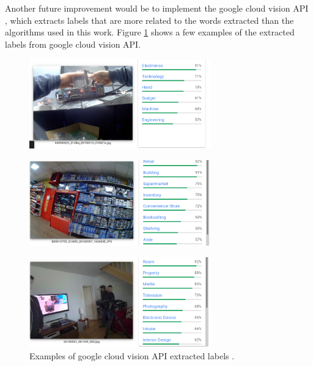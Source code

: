 Another future improvement would be to implement the google cloud vision API \cite{google}, which extracts labels that are more related to the words extracted than the algorithms used in this work. Figure \ref{fig:visiiion} shows a few examples of the extracted labels from google cloud vision API.
\newpage

\begin{figure}[H]
    \centering
    \captionsetup{justification=centering}
    \includegraphics[width=0.7\textwidth]{Sections/8Conclusion/images/google.png} 
  

  \end{figure}


\begin{figure}[H]
    \centering
    \captionsetup{justification=centering}
    \includegraphics[width=0.7\textwidth]{Sections/8Conclusion/images/labels.png}
  

  \end{figure}
  


\begin{figure}[H]
    \centering
    \captionsetup{justification=centering}

    \includegraphics[width=0.7\textwidth]{Sections/8Conclusion/images/google_labels_2.png}
    
    \caption[Google cloud vision API labels]{Examples of google cloud vision API extracted labels \cite{google}.}
    \label{fig:visiiion}
\end{figure}
